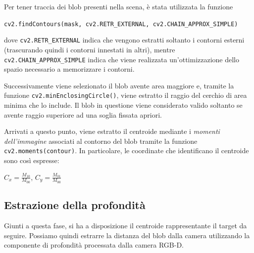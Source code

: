 Per tener traccia dei blob presenti nella scena, è stata utilizzata la funzione
\begin{center}
	\texttt{cv2.findContours(mask, cv2.RETR\_EXTERNAL, cv2.CHAIN\_APPROX\_SIMPLE)}
\end{center}
dove \texttt{cv2.RETR\_EXTERNAL} indica che vengono estratti soltanto i contorni esterni (trascurando quindi i contorni innestati in altri), mentre \texttt{cv2.CHAIN\_APPROX\_SIMPLE} indica che viene realizzata un'ottimizzazione dello spazio necessario a memorizzare i contorni.

Successivamente viene selezionato il blob avente area maggiore e, tramite la funzione \texttt{cv2.minEnclosingCircle()}, viene estratto il raggio del cerchio di area minima che lo include. Il blob in questione viene considerato valido soltanto se avente raggio superiore ad una soglia fissata apriori.

Arrivati a questo punto, viene estratto il centroide mediante i {\itshape momenti dell'immagine} associati al contorno del blob tramite la funzione \texttt{cv2.moments(contour)}. In particolare, le coordinate che identificano il centroide sono così espresse:
\begin{center}
	$C_x=\frac{M_{10}}{M_{00}}$, $C_y=\frac{M_{01}}{M_{00}}$
\end{center}

\begin{figure}[htbp]
	\begin{center}
	\end{center}
\end{figure}

\subsection{Estrazione della profondità}
Giunti a questa fase, si ha a disposizione il centroide rappresentante il target da seguire. Possiamo quindi estrarre la distanza del blob dalla camera utilizzando la componente di profondità processata dalla camera RGB-D.

